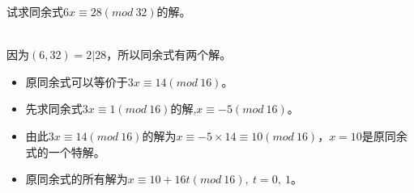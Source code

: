 \documentclass[cn,10pt]{elegantbook}
\begin{document}
\begin{example}
  试求同余式$6x \equiv 28(mod \ 32)$的解。
\end{example}
\begin{solution}
  \\因为$(6,32)=2 |28$，所以同余式有两个解。
  \begin{itemize}
    \item 原同余式可以等价于$3x \equiv 14(mod \ 16)$。
    \item 先求同余式$3x \equiv 1(mod \ 16)$的解,$x \equiv -5(mod \ 16)$。
    \item 由此$3x \equiv 14(mod \ 16)$的解为$x \equiv -5 \times 14 \equiv 10(mod\ 16)$，$x =10$是原同余式的一个特解。
    \item 原同余式的所有解为$x \equiv 10+16t(mod\ 16),\ t =0,\ 1$。
  \end{itemize}
\end{solution}
\end{document}
